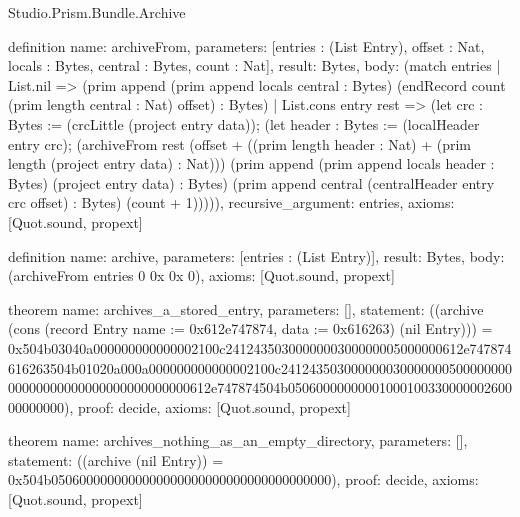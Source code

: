 \begin{lexlean}{Studio.Prism.Bundle.Archive}
\begin{semanticmodule}
definition{
  name: archiveFrom,
  parameters: [entries : (List Entry), offset : Nat, locals : Bytes, central : Bytes, count : Nat],
  result: Bytes,
  body: (match entries
    | List.nil => (prim append (prim append locals central : Bytes) (endRecord count (prim length central : Nat) offset) : Bytes)
    | List.cons entry rest => (let crc : Bytes := (crcLittle (project entry data)); (let header : Bytes := (localHeader entry crc); (archiveFrom rest (offset + ((prim length header : Nat) + (prim length (project entry data) : Nat))) (prim append (prim append locals header : Bytes) (project entry data) : Bytes) (prim append central (centralHeader entry crc offset) : Bytes) (count + 1))))),
  recursive_argument: entries,
  axioms: [Quot.sound, propext]
}

definition{
  name: archive,
  parameters: [entries : (List Entry)],
  result: Bytes,
  body: (archiveFrom entries 0 0x 0x 0),
  axioms: [Quot.sound, propext]
}

theorem{
  name: archives_a_stored_entry,
  parameters: [],
  statement: ((archive (cons (record Entry {name := 0x612e747874, data := 0x616263}) (nil Entry))) = 0x504b03040a000000000000002100c2412435030000000300000005000000612e747874616263504b01020a000a000000000000002100c24124350300000003000000050000000000000000000000000000000000612e747874504b0506000000000100010033000000260000000000),
  proof: decide{},
  axioms: [Quot.sound, propext]
}

theorem{
  name: archives_nothing_as_an_empty_directory,
  parameters: [],
  statement: ((archive (nil Entry)) = 0x504b0506000000000000000000000000000000000000),
  proof: decide{},
  axioms: [Quot.sound, propext]
}

\end{semanticmodule}
\end{lexlean}
